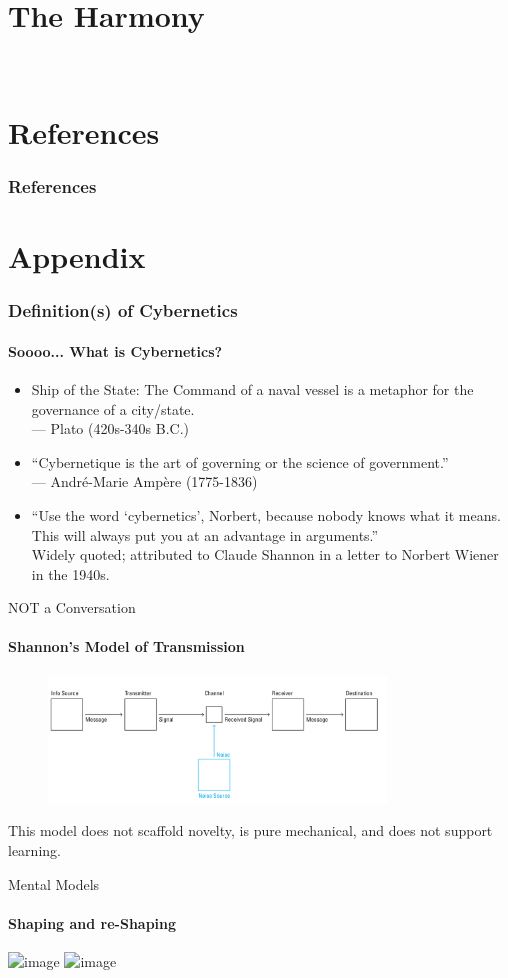 \documentclass[
	11pt,
	aspectratio=169,
]{beamer}
\begin{document}
    \section{The Harmony}
        \


\section{References}
	\begin{frame}[allowframebreaks]
		\frametitle{References}
		\printbibliography
	\end{frame}

\section*{Appendix}
	\begin{frame}
		\frametitle{Definition(s) of Cybernetics}
		\framesubtitle{Soooo... What is Cybernetics?}
		\begin{itemize}
			\item<1->Ship of the State: The Command of a naval vessel is a metaphor for the governance of a city/state.\\
			--- Plato (420s-340s B.C.)
			\item<2->``Cybernetique is the art of governing or the science of government.''\\
			--- André-Marie Ampère (1775-1836)
			\item<3->``Use the word ‘cybernetics’, Norbert, because nobody knows what it means. This will always put you at an advantage in arguments.''\\
			Widely quoted; attributed to Claude Shannon in a letter to Norbert Wiener in the 1940s.
		\end{itemize}
	\end{frame}
	\begin{frame}{NOT a Conversation}
        \framesubtitle{Shannon's Model of Transmission}
        \begin{figure}
            \centering\includegraphics[width=0.8\textwidth]{resources/transmission.PNG}
        \end{figure}
        This model does not scaffold novelty, is pure mechanical, and does not support learning.
    \end{frame}
    \begin{frame}{Mental Models}
        \framesubtitle{Shaping and re-Shaping}
            \centering\includegraphics<1>[width=0.75\textwidth]{resources/models6.PNG}
            \centering\includegraphics<2>[height=0.77\textheight]{resources/models7.PNG}
    \end{frame}
\end{document}
